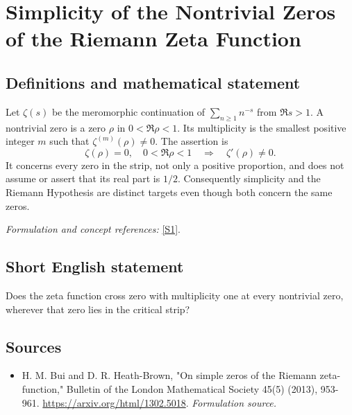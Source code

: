 \documentclass[11pt]{article}
\begin{document}
\section*{\texorpdfstring{Simplicity of the Nontrivial Zeros of the Riemann Zeta Function}{Simplicity of the Nontrivial Zeros of the Riemann Zeta Function}}\label{statement}
\subsection{Definitions and mathematical statement}
Let $\zeta(s)$ be the meromorphic continuation of $\sum_{n\ge1}n^{-s}$ from $\Re s>1$. A nontrivial zero is a zero $\rho$ in $0<\Re\rho<1$. Its multiplicity is the smallest positive integer $m$ such that $\zeta^{(m)}(\rho)\ne0$. The assertion is
\[
 \zeta(\rho)=0,\quad0<\Re\rho<1\quad\Longrightarrow\quad\zeta'(\rho)\ne0.
\]
It concerns every zero in the strip, not only a positive proportion, and does not assume or assert that its real part is $1/2$. Consequently simplicity and the Riemann Hypothesis are distinct targets even though both concern the same zeros.
\par\smallskip\textit{Formulation and concept references:} \href{https://arxiv.org/html/1302.5018}{[S1]}.

\subsection{Short English statement}
Does the zeta function cross zero with multiplicity one at every nontrivial zero, wherever that zero lies in the critical strip?
\subsection{Sources}
\begin{itemize}
\item[S1]H. M. Bui and D. R. Heath-Brown, "On simple zeros of the Riemann zeta-function," Bulletin of the London Mathematical Society 45(5) (2013), 953-961.
\url{https://arxiv.org/html/1302.5018}.
\textit{Formulation source.}
\end{itemize}
\end{document}
